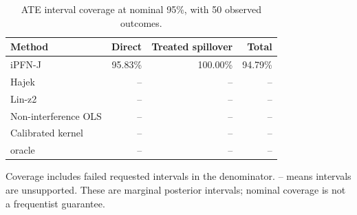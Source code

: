 \begin{table}[tb]
\centering
\caption{ATE interval coverage at nominal 95\%, with 50 observed outcomes.}
\begin{tabular}{lrrr}
\toprule
Method & Direct & Treated spillover & Total \\
\midrule
iPFN-J & 95.83\% & 100.00\% & 94.79\% \\
Hajek & -- & -- & -- \\
Lin-z2 & -- & -- & -- \\
Non-interference OLS & -- & -- & -- \\
Calibrated kernel & -- & -- & -- \\
oracle & -- & -- & -- \\
\bottomrule
\end{tabular}
\par\smallskip
\begin{minipage}{\linewidth}\scriptsize
Coverage includes failed requested intervals in the denominator. -- means intervals are unsupported.
These are marginal posterior intervals; nominal coverage is not a frequentist guarantee.
\end{minipage}
\end{table}
